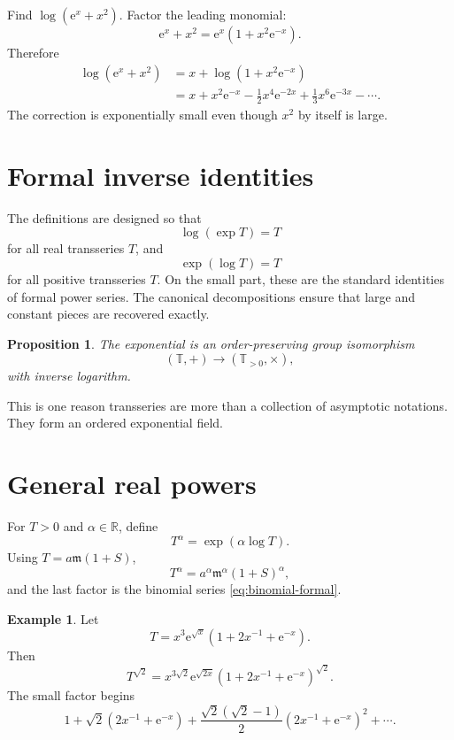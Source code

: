 \documentclass[11pt,openany]{book}
\theoremstyle{definition}
\newtheorem{example}{Example}[chapter]
\theoremstyle{plain}
\newtheorem{proposition}{Proposition}[chapter]
\theoremstyle{remark}
\newcommand{\R}{\mathbb{R}}
\newcommand{\T}{\mathbb{T}}
\newcommand{\m}{\mathfrak{m}}
\newcommand{\e}{\mathrm{e}}
\begin{document}
\begin{workedbox}
Find $\log(\e^x+x^2)$. Factor the leading monomial:
\[
 \e^x+x^2=\e^x(1+x^2\e^{-x}).
\]
Therefore
\begin{align*}
 \log(\e^x+x^2)
 &=x+\log(1+x^2\e^{-x})\\
 &=x+x^2\e^{-x}-\frac12x^4\e^{-2x}
 +\frac13x^6\e^{-3x}-\cdots.
\end{align*}
The correction is exponentially small even though $x^2$ by itself is large.
\end{workedbox}

\section{Formal inverse identities}

The definitions are designed so that
\[
 \log(\exp T)=T
\]
for all real transseries $T$, and
\[
 \exp(\log T)=T
\]
for all positive transseries $T$. On the small part, these are the standard identities of formal power series. The canonical decompositions ensure that large and constant pieces are recovered exactly.

\begin{proposition}
The exponential is an order-preserving group isomorphism
\[
 (\T,+)\longrightarrow(\T_{>0},\times),
\]
with inverse logarithm.
\end{proposition}

This is one reason transseries are more than a collection of asymptotic notations. They form an ordered exponential field.

\section{General real powers}

For $T>0$ and $\alpha\in\R$, define
\begin{equation}\label{eq:real-power}
 T^\alpha=\exp(\alpha\log T).
\end{equation}
Using $T=a\m(1+S)$,
\[
 T^\alpha=a^\alpha\m^\alpha(1+S)^\alpha,
\]
and the last factor is the binomial series \cref{eq:binomial-formal}.

\begin{example}
Let
\[
 T=x^3\e^{\sqrt{x}}(1+2x^{-1}+\e^{-x}).
\]
Then
\[
 T^{\sqrt2}
 =x^{3\sqrt2}\e^{\sqrt{2x}}
 \left(1+2x^{-1}+\e^{-x}\right)^{\sqrt2}.
\]
The small factor begins
\[
 1+\sqrt2(2x^{-1}+\e^{-x})
 +\frac{\sqrt2(\sqrt2-1)}2(2x^{-1}+\e^{-x})^2+\cdots.
\]
\end{example}
\end{document}
